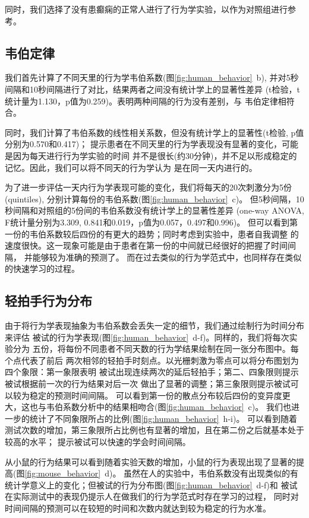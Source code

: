 同时，我们选择了没有患癫痫的正常人进行了行为学实验，以作为对照组进行参考。

\subsection{韦伯定律}
我们首先计算了不同天里的行为学韦伯系数(图\ref{fig:human_behavior}~b),
并对5秒间隔和10秒间隔进行了对比，结果两者之间没有统计学上的显著性差异
(t检验，t统计量为1.130，p值为0.259)。表明两种间隔的行为没有差别，与
韦伯定律相符合\cite{gibbon1977scalar, hardy2018encoding}。

同时，我们计算了韦伯系数的线性相关系数，但没有统计学上的显著性(t检验, p值分别为0.570和0.417)；
提示患者在不同天里的行为学表现没有显著的变化，可能是因为每天进行行为学实验的时间
并不是很长(约30分钟)，并不足以形成稳定的记忆。因此，我们可以将不同天的行为学认为
是在同一天内进行的。

为了进一步评估一天内行为学表现可能的变化，我们将每天的20次刺激分为5份(quintiles),
分别计算每份的韦伯系数(图\ref{fig:human_behavior}~c)。
但5秒间隔，10秒间隔和对照组的5份间的韦伯系数没有统计学上的显著性差异
(one-way ANOVA, F统计量分别为3.309, 0.841和0.019，p值为0.057，0.497和0.996)。
但可以看到第一份的韦伯系数较后四份的有更大的趋势；同时考虑到实验中，患者自我调整
的速度很快。这一现象可能是由于患者在第一份的中间就已经很好的把握了时间间隔，
并能够较为准确的预测了。
而在过去类似的行为学范式中，也同样存在类似的快速学习的过程\cite{simen2011model}。

\subsection{轻拍手行为分布}
由于将行为学表现抽象为韦伯系数会丢失一定的细节，我们通过绘制行为时间分布来评估
被试的行为学表现(图\ref{fig:human_behavior}~d-f)。同样的，我们将每次实验分为
五份，将每份不同患者不同天数的行为学结果绘制在同一张分布图中。每个点代表了前后
两次相邻的轻拍手时刻点。以光栅刺激为零点可以将分布图划为四个象限：第一象限表明
被试出现连续两次的延后轻拍手；第二、四象限则提示被试根据前一次的行为结果对后一次
做出了显著的调整；第三象限则提示被试可以较为稳定的预测时间间隔。
可以看到第一份的散点分布较后四份的变异度更大，这也与韦伯系数分析中的结果相吻合(图\ref{fig:human_behavior}~c)。
我们也进一步的统计了不同象限所占的比例(图\ref{fig:human_behavior}~h-i)。
可以看到随着测试次数的增加，第三象限所占比例也有显著的增加，且在第二份之后就基本处于较高的水平；
提示被试可以快速的学会时间间隔。

\bigskip
从小鼠的行为结果可以看到随着实验天数的增加，小鼠的行为表现出现了显著的提高(图\ref{fig:mouse_behavior}~d)。
虽然在人的实验中，韦伯系数没有出现类似的有统计学意义上的变化；但被试的行为分布图(图\ref{fig:human_behavior}~d-f)和
被试在实际测试中的表现仍提示人在做我们的行为学范式时存在学习的过程，
同时对时间间隔的预测可以在较短的时间和次数内就达到较为稳定的行为水准。

